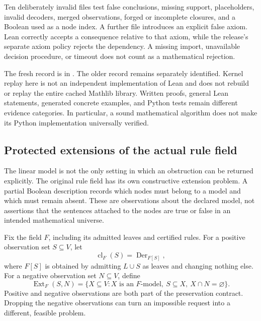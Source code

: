 Ten deliberately invalid files test false conclusions, missing support, placeholders, invalid decoders, merged observations, forged or incomplete closures, and a Boolean used as a node index. A further file introduces an explicit false axiom. Lean correctly accepts a consequence relative to that axiom, while the release's separate axiom policy rejects the dependency. A missing import, unavailable decision procedure, or timeout does not count as a mathematical rejection.

The fresh record is in . The older record remains separately identified. Kernel replay here is not an independent implementation of Lean and does not rebuild or replay the entire cached Mathlib library. Written proofs, general Lean statements, generated concrete examples, and Python tests remain different evidence categories. In particular, a sound mathematical algorithm does not make its Python implementation universally verified.

\subsection{Protected extensions of the actual rule field}
\label{PPT:sec:protected-rule-extension}

The linear model is not the only setting in which an obstruction can be returned explicitly. The original rule field has its own constructive extension problem. A partial Boolean description records which nodes must belong to a model and which must remain absent. These are observations about the declared model, not assertions that the sentences attached to the nodes are true or false in an intended mathematical universe.

Fix the field $F$, including its admitted leaves and certified rules. For a positive observation set $S\subseteq V$, let
\[
  \operatorname{cl}_F(S)=\operatorname{Der}_{F[S]},
\]
where $F[S]$ is obtained by admitting $L\cup S$ as leaves and changing nothing else. For a negative observation set $N\subseteq V$, define
\[
 \operatorname{Ext}_F(S,N)=
 \{X\subseteq V:X\text{ is an }F\text{-model},\ S\subseteq X,\ X\cap N=\varnothing\}.
\]
Positive and negative observations are both part of the preservation contract. Dropping the negative observations can turn an impossible request into a different, feasible problem.

